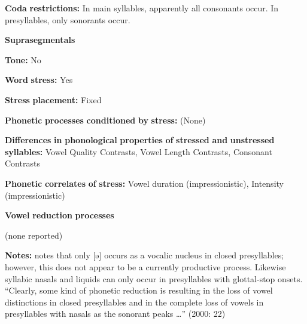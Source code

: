 \documentclass[output=paper]{langsci/langscibook}
\begin{document}
\begin{styleBody}
\textbf{Coda} \textbf{restrictions:} In main syllables, apparently all consonants occur. In presyllables, only sonorants occur.
\end{styleBody}

\begin{styleBody}
\textbf{Suprasegmentals}
\end{styleBody}

\begin{styleBody}
\textbf{Tone:} No
\end{styleBody}

\begin{styleBody}
\textbf{Word} \textbf{stress:} Yes
\end{styleBody}

\begin{styleBody}
\textbf{Stress} \textbf{placement:} Fixed
\end{styleBody}

\begin{styleBody}
\textbf{Phonetic} \textbf{processes} \textbf{conditioned} \textbf{by} \textbf{stress:} (None)
\end{styleBody}

\begin{styleBody}
\textbf{Differences} \textbf{in} \textbf{phonological} \textbf{properties} \textbf{of} \textbf{stressed} \textbf{and} \textbf{unstressed} \textbf{syllables:} Vowel Quality Contrasts, Vowel Length Contrasts, Consonant Contrasts
\end{styleBody}

\begin{styleBody}
\textbf{Phonetic} \textbf{correlates} \textbf{of} \textbf{stress:} Vowel duration (impressionistic), Intensity (impressionistic)
\end{styleBody}

\begin{styleBody}
\textbf{Vowel} \textbf{reduction} \textbf{processes}
\end{styleBody}

\begin{styleBody}
(none reported)
\end{styleBody}

\begin{styleBody}
\textbf{Notes:} \citet{Alves2000} notes that only [ə] occurs as a vocalic nucleus in closed presyllables; however, this does not appear to be a currently productive process. Likewise syllabic nasals and liquids can only occur in presyllables with glottal-stop onsets. “Clearly, some kind of phonetic reduction is resulting in the loss of vowel distinctions in closed presyllables and in the complete loss of vowels in presyllables with nasals as the sonorant peaks …” (2000: 22)
\end{styleBody}
\end{document}

